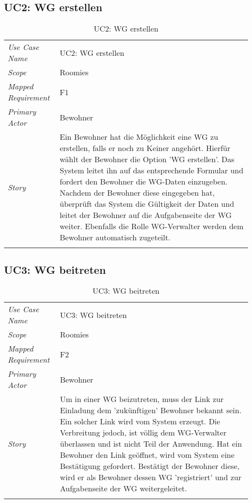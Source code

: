 \subsection{UC2: WG erstellen}
\begin{table}[H]
	\tablestyle
	\tablealtcolored
	\begin{tabularx}{\textwidth}{lX}
		\tablebody
			\textit{Use Case Name} &
			UC2: WG erstellen
			\tabularnewline
			\textit{Scope} &
			Roomies
			\tabularnewline
			\textit{Mapped Requirement} &
			F1
			\tabularnewline
			\textit{Primary Actor} &
			Bewohner
			\tabularnewline
			\textit{Story} &
			Ein Bewohner hat die Möglichkeit eine WG zu erstellen, falls er noch zu Keiner angehört. Hierfür wählt der Bewohner die Option 'WG erstellen'. Das System leitet ihn auf das entsprechende Formular und fordert den Bewohner die WG-Daten einzugeben. Nachdem der Bewohner diese eingegeben hat, überprüft das System die Gültigkeit der Daten und leitet der Bewohner auf die Aufgabenseite der WG weiter. Ebenfalls die Rolle WG-Verwalter werden dem Bewohner automatisch zugeteilt.
			\tabularnewline
		\tableend
	\end{tabularx}
	\caption{UC2: WG erstellen}
\end{table}


\subsection{UC3: WG beitreten}
\begin{table}[H]
	\tablestyle
	\tablealtcolored
	\begin{tabularx}{\textwidth}{lX}
		\tablebody
			\textit{Use Case Name} &
			UC3: WG beitreten
			\tabularnewline
			\textit{Scope} &
			Roomies
			\tabularnewline
			\textit{Mapped Requirement} &
			F2
			\tabularnewline
			\textit{Primary Actor} &
			Bewohner
			\tabularnewline
			\textit{Story} &
			Um in einer WG beizutreten, muss der Link zur Einladung dem 'zukünftigen' Bewohner bekannt sein. Ein solcher Link wird vom System erzeugt. Die Verbreitung jedoch, ist völlig dem WG-Verwalter überlassen und ist nicht Teil der Anwendung. Hat ein Bewohner den Link geöffnet, wird vom System eine Bestätigung gefordert. Bestätigt der Bewohner diese, wird er als Bewohner dessen WG 'registriert' und zur Aufgabenseite der WG weitergeleitet.
			\tabularnewline
		\tableend
	\end{tabularx}
	\caption{UC3: WG beitreten}
\end{table}


